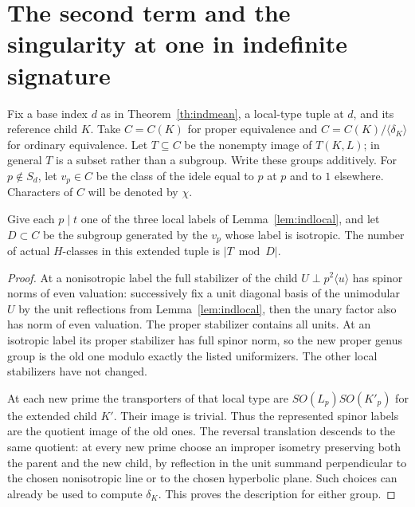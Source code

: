\section{The second term and the singularity at one in indefinite signature}\label{sec:spinboundary}
Fix a base index $d$ as in Theorem~\ref{th:indmean}, a local-type
tuple at $d$, and its reference child $K$. Take $C=C(K)$ for proper
equivalence and $C=C(K)/\langle\delta_K\rangle$ for ordinary
equivalence. Let $T\subseteq C$ be the nonempty image of $T(K,L)$;
in general $T$ is a subset rather than a subgroup. Write these
groups additively. For $p\notin S_d$, let $v_p\in C$ be the class of the
idele equal to $p$ at $p$ and to $1$ elsewhere. Characters of $C$ will be denoted by $\chi$.

\begin{lemma}\label{lem:projection}
Give each $p\mid t$ one of the three local labels of Lemma~\ref{lem:indlocal}, and let $D\subset C$ be the subgroup generated by the $v_p$ whose label is isotropic. The number of actual $H$-classes in this extended tuple is $|T\bmod D|$.
\end{lemma}
\begin{proof}
At a nonisotropic label the full stabilizer of the child $U\perp p^2\langle u\rangle$ has spinor norms of even valuation: successively fix a unit diagonal basis of the unimodular $U$ by the unit reflections from Lemma~\ref{lem:indlocal}, then the unary factor also has norm of even valuation. The proper stabilizer contains all units. At an isotropic label its proper stabilizer has full spinor norm, so the new proper genus group is the old one modulo exactly the listed uniformizers. The other local stabilizers have not changed.

At each new prime the transporters of that local type are $SO(L_p)SO(K'_p)$ for the extended child $K'$. Their image is trivial. Thus the represented spinor labels are the quotient image of the old ones. The reversal translation descends to the same quotient: at every new prime choose an improper isometry preserving both the parent and the new child, by reflection in the unit summand perpendicular to the chosen nonisotropic line or to the chosen hyperbolic plane. Such choices can already be used to compute $\delta_K$. This proves the description for either group.
\end{proof}

